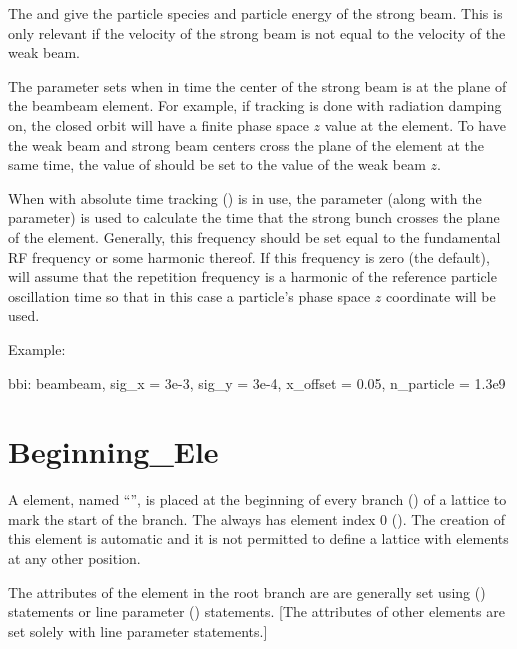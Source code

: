 The  and  give the particle species and particle energy of the
strong beam. This is only relevant if the velocity of the strong beam is not equal to the velocity
of the weak beam.

The  parameter sets when in time the center of the strong beam is at the plane of the
beambeam element. For example, if tracking is done with radiation damping on, the closed orbit will
have a finite phase space $z$ value at the  element. To have the weak beam and strong beam
centers cross the plane of the  element at the same time, the value of  should
be set to the value of the weak beam $z$.

When with absolute time tracking () is in use, the 
parameter (along with the  parameter) is used to calculate the time that the strong
bunch crosses the plane of the  element. Generally, this frequency should be set equal
to the fundamental RF frequency or some harmonic thereof. If this frequency is zero (the default),
\bmad will assume that the repetition frequency is a harmonic of the reference particle oscillation
time so that in this case a particle's phase space $z$ coordinate will be used.

Example:
\begin{example}
  bbi: beambeam, sig_x = 3e-3, sig_y = 3e-4, x_offset = 0.05, n_particle = 1.3e9
\end{example}

\newpage

\section{Beginning_Ele}
\label{s:begin.ele}

A  element, named ``'', is placed at the beginning of every branch
() of a lattice to mark the start of the branch. The  always
has element index 0 (). The creation of this  element is
automatic and it is not permitted to define a lattice with  elements at any
other position.

The attributes of the  element in the root branch are are generally set using
 () statements or line parameter () statements.
[The attributes of other  elements are set solely with line parameter statements.]

